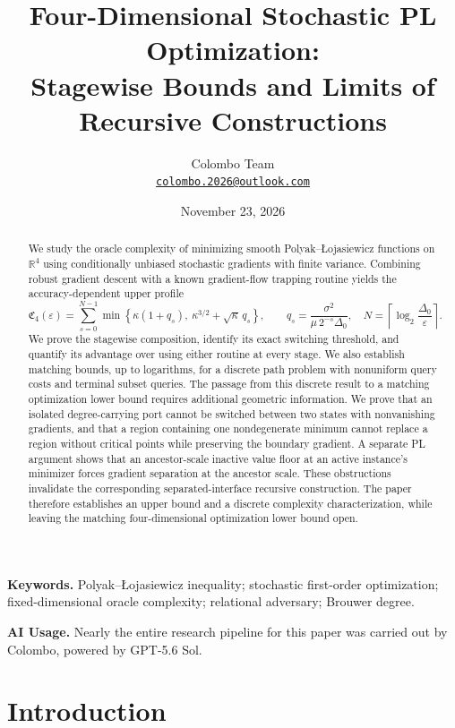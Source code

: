 \documentclass[11pt,a4paper]{article}
\title{\bfseries Four-Dimensional Stochastic PL Optimization:\\[0.2em]
Stagewise Bounds and Limits of Recursive Constructions}
\author{Colombo Team\\[0.3em]
\small\href{mailto:colombo.2026@outlook.com}{\texttt{colombo.2026@outlook.com}}}
\date{November 23, 2026}
\newcommand{\R}{\mathbb R}
\newcommand{\eps}{\varepsilon}
\newcommand{\profile}{\mathfrak C_4}
\theoremstyle{definition}
\theoremstyle{remark}
\begin{document}
\maketitle

\begin{abstract}
We study the oracle complexity of minimizing smooth
Polyak--\L{}ojasiewicz functions on $\R^4$ using conditionally unbiased
stochastic gradients with finite variance.  Combining robust gradient
descent with a known gradient-flow trapping routine yields the
accuracy-dependent upper profile
\[
 \profile(\eps)=\sum_{s=0}^{N-1}
 \min\!\left\{\kappa(1+q_s),\
               \kappa^{3/2}+\sqrt{\kappa}\,q_s\right\},
 \qquad
 q_s=\frac{\sigma^2}{\mu\,2^{-s}\Delta_0},
 \quad
 N=\left\lceil\log_2\frac{\Delta_0}{\eps}\right\rceil .
\]
We prove the stagewise composition, identify its exact switching
threshold, and quantify its advantage over using either routine at every
stage.  We also establish matching bounds, up to logarithms, for a
discrete path problem with nonuniform query costs and terminal subset
queries.  The passage from this discrete result to a matching
optimization lower bound requires additional geometric information.
We prove that an isolated degree-carrying port cannot be switched
between two states with nonvanishing gradients, and that a region
containing one nondegenerate minimum cannot replace a region without
critical points while preserving the boundary gradient.  A separate PL
argument shows that an ancestor-scale inactive value floor at an active
instance's minimizer forces gradient separation at the ancestor scale.
These obstructions invalidate the corresponding separated-interface
recursive construction.  The paper therefore establishes an upper
bound and a discrete complexity characterization, while leaving the
matching four-dimensional optimization lower bound open.
\end{abstract}

\noindent\textbf{Keywords.}
Polyak--\L{}ojasiewicz inequality; stochastic first-order optimization;
fixed-dimensional oracle complexity; relational adversary;
Brouwer degree.
\par
\begin{samepage}
\noindent\textbf{AI Usage.}
Nearly the entire research pipeline for this paper was carried out by
Colombo, powered by GPT-5.6 Sol.
\par
\end{samepage}

\section{Introduction}
\end{document}
